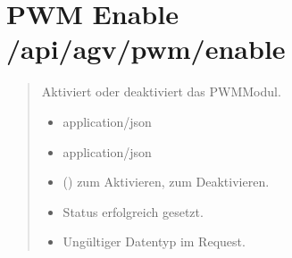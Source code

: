 \documentclass[letterpaper,10pt,english]{sphinxmanual}
\begin{document}
\section{PWM Enable \textendash{} /api/agv/pwm/enable}
\label{\detokenize{agv_rest_api_pwm:pwm-enable-api-agv-pwm-enable}}\label{\detokenize{agv_rest_api_pwm:post-api-agv-pwm-enable}}

\begin{fulllineitems}
\label{\detokenize{agv_rest_api_pwm:post--api-agv-pwm-enable}}
\pysigstartsignatures
\pysigline
{}
\pysigstopsignatures\begin{quote}\begin{description}
\sphinxAtStartPar
Aktiviert oder deaktiviert das PWM\sphinxhyphen{}Modul.

\begin{itemize}
\item {} 
\sphinxAtStartPar
{} \textendash{} application/json

\end{itemize}

\begin{itemize}
\item {} 
\sphinxAtStartPar
{} \textendash{} application/json

\end{itemize}

\begin{itemize}
\item {} 
\sphinxAtStartPar
{} () \textendash{}  zum Aktivieren,  zum Deaktivieren.

\end{itemize}

\begin{itemize}
\item {} 
\sphinxAtStartPar
{} \textendash{} Status erfolgreich gesetzt.

\item {} 
\sphinxAtStartPar
{} \textendash{} Ungültiger Datentyp im Request.

\end{itemize}

\end{description}\end{quote}

\end{fulllineitems}
\end{document}
